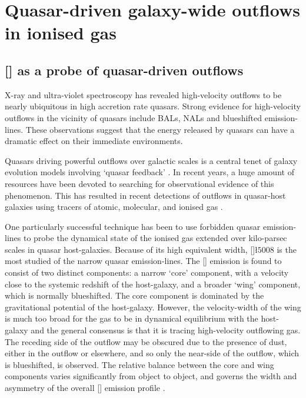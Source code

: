 
\chapter{Quasar-driven galaxy-wide outflows in ionised gas}

\label{ch:nlr} 

\section{[] as a probe of quasar-driven outflows}

X-ray and ultra-violet spectroscopy has revealed high-velocity outflows to be nearly ubiquitous in high accretion rate quasars.
Strong evidence for high-velocity outflows in the vicinity of quasars include BALs, NALs and blueshifted emission-lines. 
These observations suggest that the energy released by quasars can have a dramatic effect on their immediate environments. 

Quasars driving powerful outflows over galactic scales is a central tenet of galaxy evolution models involving `quasar feedback' \citep[e.g.][]{silk98,springel05,bower06}.
In recent years, a huge amount of resources have been devoted to searching for observational evidence of this phenomenon.  
This has resulted in recent detections of outflows in quasar-host galaxies using tracers of atomic, molecular, and ionised gas \citep[e.g.][]{nesvadba06,arav08,nesvadba08,moe09,alexander10,dunn10,feruglio10,nesvadba10,alatalo11,cano-diaz12,harrison12,harrison14,cimatti13,rupke13,veilleux13,cicone14,nardini15}.  

One particularly successful technique has been to use forbidden quasar emission-lines to probe the dynamical state of the ionised gas extended over kilo-parsec scales in quasar host-galaxies. 
Because of its high equivalent width, []\l$5008$ is the most studied of the narrow quasar emission-lines. 
The [] emission is found to consist of two distinct components: a narrow `core' component, with a velocity close to the systemic redshift of the host-galaxy, and a broader `wing' component, which is normally blueshifted. 
The core component is dominated by the gravitational potential of the host-galaxy.
However, the velocity-width of the wing is much too broad for the gas to be in dynamical equilibrium with the host-galaxy \citep[e.g.][]{liu13} and the general consensus is that it is tracing high-velocity outflowing gas. The receding side of the outflow may be obscured due to the presence of dust, either in the outflow or elsewhere, and so only the near-side of the outflow, which is blueshifted, is observed. 
The relative balance between the core and wing components varies significantly from object to object, and governs the width and asymmetry of the overall [] emission profile \citep[e.g.][]{shen14}. 


